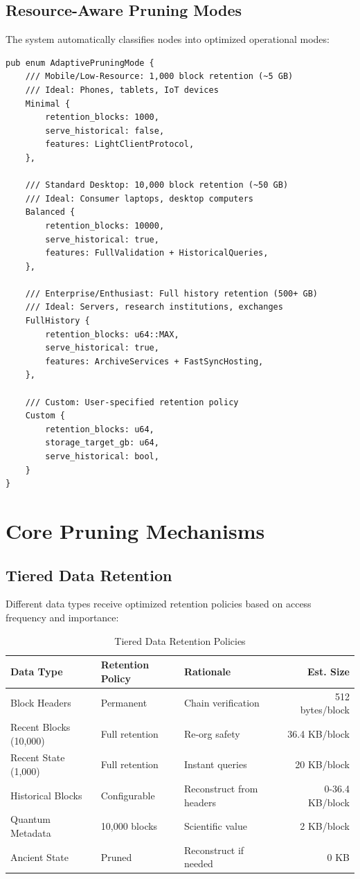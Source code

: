 \documentclass[11pt,a4paper]{article}
\begin{document}
\subsection{Resource-Aware Pruning Modes}

The system automatically classifies nodes into optimized operational modes:

\begin{lstlisting}
pub enum AdaptivePruningMode {
    /// Mobile/Low-Resource: 1,000 block retention (~5 GB)
    /// Ideal: Phones, tablets, IoT devices
    Minimal {
        retention_blocks: 1000,
        serve_historical: false,
        features: LightClientProtocol,
    },

    /// Standard Desktop: 10,000 block retention (~50 GB)
    /// Ideal: Consumer laptops, desktop computers
    Balanced {
        retention_blocks: 10000,
        serve_historical: true,
        features: FullValidation + HistoricalQueries,
    },

    /// Enterprise/Enthusiast: Full history retention (500+ GB)
    /// Ideal: Servers, research institutions, exchanges
    FullHistory {
        retention_blocks: u64::MAX,
        serve_historical: true,
        features: ArchiveServices + FastSyncHosting,
    },

    /// Custom: User-specified retention policy
    Custom {
        retention_blocks: u64,
        storage_target_gb: u64,
        serve_historical: bool,
    }
}
\end{lstlisting}

\section{Core Pruning Mechanisms}

\subsection{Tiered Data Retention}

Different data types receive optimized retention policies based on access frequency and importance:

\begin{table}[h]
\centering
\begin{tabular}{lllr}
\toprule
\textbf{Data Type} & \textbf{Retention Policy} & \textbf{Rationale} & \textbf{Est. Size} \\
\midrule
Block Headers & Permanent & Chain verification & 512 bytes/block \\
Recent Blocks (10,000) & Full retention & Re-org safety & 36.4 KB/block \\
Recent State (1,000) & Full retention & Instant queries & 20 KB/block \\
Historical Blocks & Configurable & Reconstruct from headers & 0-36.4 KB/block \\
Quantum Metadata & 10,000 blocks & Scientific value & 2 KB/block \\
Ancient State & Pruned & Reconstruct if needed & 0 KB \\
\bottomrule
\end{tabular}
\caption{Tiered Data Retention Policies}
\end{table}
\end{document}
